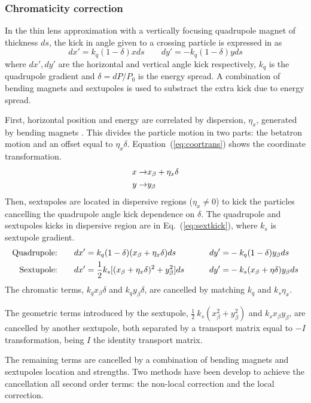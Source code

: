 \subsubsection{Chromaticity correction}\label{s:chromcorr}
In the thin lens approximation with a vertically focusing quadrupole magnet of thickness $ds$, the kick in angle given to a crossing particle is expressed in \cite{CAS9104} as
\begin{equation}
 dx'=k_q(1-\delta)xds\qquad dy'=-k_q(1-\delta)yds
\end{equation}
where $dx', dy'$ are the horizontal and vertical angle kick respectively, $k_q$ is the quadrupole gradient and $\delta=dP/P_0$ is the energy spread. A combination of bending magnets and sextupoles is used to substract the extra kick due to energy spread.\par
First, horizontal position and energy are correlated by dispersion, $\eta_x$, generated by bending magnets \cite{CAS9104}. This divides the particle motion in two parts: the betatron motion and an offset equal to $\eta_x\delta$. Equation~(\ref{eq:coortrans}) shows the coordinate transformation.
\begin{align}
 x\rightarrow& x_\beta + \eta_x \delta\label{eq:coortrans}\\
 y\rightarrow& y_\beta\notag
\end{align}
Then, sextupoles are located in dispersive regions ($\eta_x\neq0$) to kick the particles cancelling the quadrupole angle kick dependence on $\delta$. The quadrupole and sextupoles kicks in dispersive region are in Eq.~(\ref{eq:sextkick}), where $k_s$ is sextupole gradient.
\begin{align}
 \text{Quadrupole:}&\qquad dx'=k_q(1-\delta)(x_\beta+\eta_x\delta)ds\qquad& dy'=&-k_q(1-\delta)y_\beta ds \label{eq:sextkick}\\
 \text{Sextupole:}&\qquad dx'=\frac{1}{2}k_s[(x_\beta+\eta_x\delta)^2+y_\beta^2]ds\qquad& dy'=&-k_s(x_\beta+\eta\delta)y_\beta ds\notag
\end{align}
The chromatic terms, $k_q x_\beta\delta$ and $k_q y_\beta\delta$, are cancelled by matching $k_q$ and $k_s\eta_x$.\par
The geometric terms introduced by the sextupole, $\frac{1}{2}~k_s(x^2_\beta+y^2_\beta)$ and $k_sx_\beta y_\beta$, are cancelled by another sextupole, both separated by a transport matrix equal to $-I$ transformation, being $I$ the identity transport matrix.\par
The remaining terms are cancelled by a combination of bending magnets and sextupoles location and strengths. Two methods have been develop to achieve the cancellation all second order terms: the non-local correction and the local correction.\par
